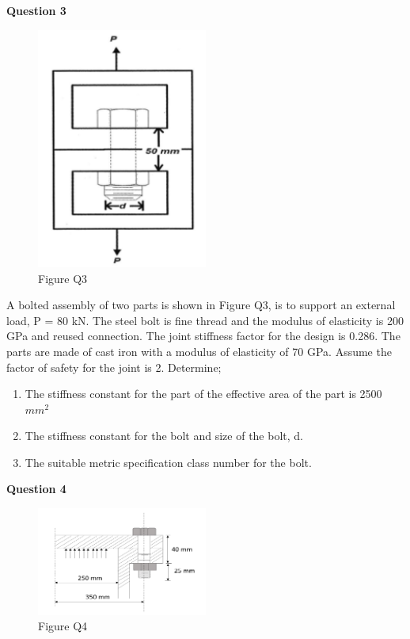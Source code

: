 \documentclass[a4paper, fleqn]{article}
\begin{document}
\newpage
\textbf{Question 3}

\begin{figure}[h]
    \centering
    \includegraphics[width=0.5\textwidth]{t31-q3.png}
    \caption{Figure Q3}
\end{figure}

A bolted assembly of two parts is shown in Figure Q3, is to support an external load, P = 80 kN. The steel bolt is fine thread and the modulus of elasticity is 200 GPa and reused connection. The joint stiffness factor for the design is 0.286. The parts are made of cast iron with a modulus of elasticity of 70 GPa. Assume the factor of safety for the joint is 2. Determine;

\begin{enumerate}[label=(\roman*)]
    \item The stiffness constant for the part of the effective area of the part is 2500 $mm^2$
    \item The stiffness constant for the bolt and size of the bolt, d.
    \item The suitable metric specification class number for the bolt.
\end{enumerate}


\newpage
\textbf{Question 4}

\begin{figure}[h]
    \centering
    \includegraphics[width=0.5\textwidth]{t31-q4.png}
    \caption{Figure Q4}
\end{figure}
\end{document}
